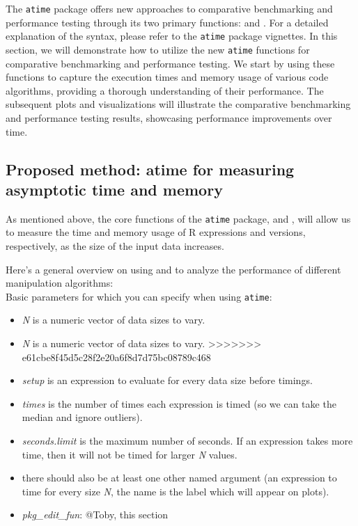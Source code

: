 \noindent The \texttt{atime} package offers new approaches to comparative benchmarking and performance testing through its two primary functions:  and . For a detailed explanation of the syntax, please refer to the \texttt{atime} package vignettes. In this section, we will demonstrate how to utilize the new \texttt{atime} functions for comparative benchmarking and performance testing. We start by using these functions to capture the execution times and memory usage of various code algorithms, providing a thorough understanding of their performance. The subsequent plots and visualizations will illustrate the comparative benchmarking and performance testing results, showcasing performance improvements over time.\\


\subsection{Proposed method: atime for measuring asymptotic time and memory}

\noindent As mentioned above, the core functions of the \texttt{atime} package,  and , will allow us to measure the time and memory usage of R expressions and versions, respectively, as the size of the input data increases.

\noindent Here's a general overview on using  and  to analyze the performance of different manipulation algorithms:\\

\noindent Basic parameters for which you can specify when using \texttt{atime}:

\begin{itemize}


  \item \textit{N} is a numeric vector of data sizes to vary.

 \item \textit{N} is a numeric vector of data sizes to vary.
>>>>>>> e61cbe8f45d5c28f2e20a6f8d7d75bc08789c468
  \item \textit{setup} is an expression to evaluate for every data size before timings.
  \item \textit{times} is the number of times each expression is timed (so we can take the median and ignore outliers).
  \item \textit{seconds.limit} is the maximum number of seconds. If an expression takes more time, then it will not be timed for larger \textit{N} values.
  \item there should also be at least one other named argument (an expression to time for every size \textit{N}, the name is the label which will appear on plots).
  \item \textit{pkg\_edit\_fun}: @Toby, this section

\end{itemize}

